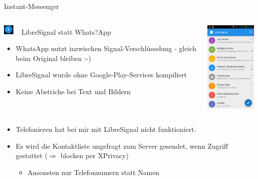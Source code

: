 \documentclass{beamer}
\begin{document}
\begin{frame}{Instant-Messenger}

\begin{columns}[c]
  \begin{column}[T]{.7\textwidth}
    \vspace{-0.2cm}
  \includegraphics[width=0.5cm]{sig.png} ~  LibreSignal statt Whats?App
    

    \begin{itemize}
      \item WhatsApp nutzt inzwischen Signal-Verschlüsselung - gleich beim Original bleiben :-) 
        \item LibreSignal wurde ohne Google-Play-Services kompiliert
        \item Keine Abstriche bei Text und Bildern
    \end{itemize}
  \end{column}
  \begin{column}[T]{.3\textwidth}
    \includegraphics[width=3.5cm]{signal.png} 
   \end{column}
\end{columns}
        \pause

\begin{columns}[c]
  \begin{column}[T]{.7\textwidth}

    \vspace{-2.4cm}
      \begin{itemize}
        \item Telefonieren hat bei mir mit LibreSignal nicht funktioniert.
        \item Es wird die Kontaktliste ungefragt zum Server gesendet, wenn Zugriff gestattet ($\Longrightarrow$ blocken per XPrivacy)
        \begin{itemize}
          \item Ansonsten nur Telefonnumern statt Namen
        \end{itemize}
      \end{itemize}
   \end{column}
  \begin{column}[T]{.3\textwidth}
   \end{column}
\end{columns}

\end{frame}
\end{document}
